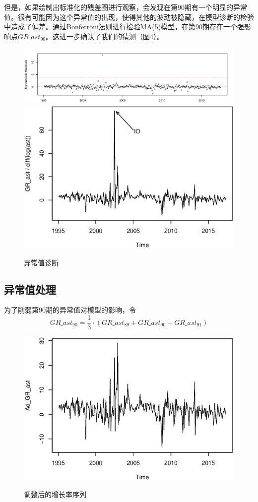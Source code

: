 \documentclass[10pt]{article}
\begin{document}
但是，如果绘制出标准化的残差图进行观察，会发现在第90期有一个明显的异常值。很有可能因为这个异常值的出现，使得其他的波动被隐藏，在模型诊断的检验中造成了偏差。通过Bonferroni法则进行检验MA(5)模型，在第90期存在一个强影响点$GR\_ast_{90}$。这进一步确认了我们的猜测（图4）。
\begin{figure}
    \caption{异常值诊断}
	\centering
	\includegraphics[width=0.8\linewidth]{pic/srgr_ast}
	\label{fig:srgrast}
	\includegraphics[width=0.5\linewidth]{pic/io}
	\label{fig:io}
\end{figure}


\subsection{异常值处理}
为了削弱第90期的异常值对模型的影响，令
$$GR\_ast_{90} = \frac{1}{3} \cdot (GR\_ast_{89}+GR\_ast_{90}+GR\_ast_{91})$$

\begin{figure}
    \caption{调整后的增长率序列}
	\centering
	\includegraphics[width=0.5\linewidth]{pic/adgrast}
	\label{fig:adgrast}
\end{figure}
\end{document}

